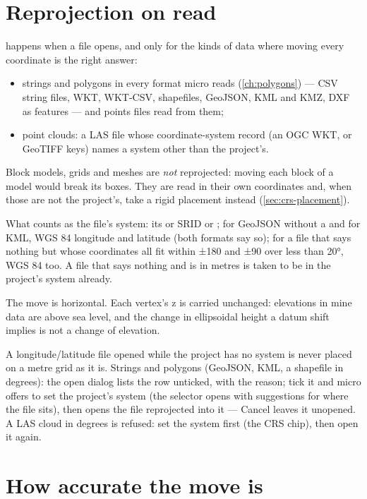 \section{Reprojection on read}\label{sec:crs-reproject}

 happens when a file opens, and only for the kinds of data where moving every
coordinate is the right answer:

\begin{itemize}
\item strings and polygons in every format micro reads (\cref{ch:polygons}) — CSV string files, WKT,
  WKT-CSV, shapefiles, GeoJSON, KML and KMZ, DXF as features — and points files read from them;
\item point clouds: a LAS file whose coordinate-system record (an OGC WKT, or GeoTIFF keys) names a
  system other than the project's.
\end{itemize}

Block models, grids and meshes are \emph{not} reprojected: moving each block of a model would break its
boxes. They are read in their own coordinates and, when those are not the project's, take a rigid
placement instead (\cref{sec:crs-placement}).

What counts as the file's system: its  or SRID or ; for GeoJSON without a
 and for KML, WGS 84 longitude and latitude (both formats say so); for a file that says
nothing but whose coordinates all fit within ±180 and ±90 over less than 20°, WGS 84 too. A file that
says nothing and is in metres is taken to be in the project's system already.

The move is horizontal. Each vertex's z is carried unchanged: elevations in mine data are above sea
level, and the change in ellipsoidal height a datum shift implies is not a change of elevation.

\begin{caution}
A longitude/latitude file opened while the project has no system is never placed on a metre grid as
it is. Strings and polygons (GeoJSON, KML, a shapefile in degrees): the open dialog lists the row
unticked, with the reason; tick it and micro offers to set the project's system (the selector opens
with suggestions for where the file sits), then opens the file reprojected into it --- Cancel leaves it
unopened. A LAS cloud in degrees is refused: set the system first (the CRS chip), then open it again.
\end{caution}

\section{How accurate the move is}\label{sec:crs-accuracy}

